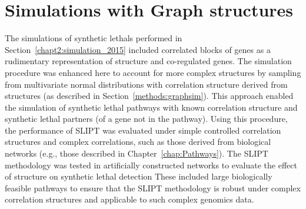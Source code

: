 

\iffalse
\section{Developing a linear model predictor of \glspl{synthetic lethal}}
\subsection{Linear models}
\subsection{Polynomial models}
\subsection{Conditioning}
\subsection{SLIPTv2}
\fi

\FloatBarrier

\section{Simulations with Graph structures}
\label{chapt5:graphsim}

The simulations of \glspl{synthetic lethal} performed in Section~\ref{chapt2:simulation_2015} included correlated blocks of genes as a rudimentary representation of  structure and co-regulated genes. The simulation procedure was enhanced here to account for more complex  structures by sampling from multivariate normal distributions with correlation structure derived from  structures (as described in Section~\ref{methods:graphsim}). This approach enabled the simulation of \gls{synthetic lethal} pathways with known correlation structure and synthetic lethal partners (of a gene not in the pathway).  Using this procedure, the performance of \gls{SLIPT} was evaluated under simple controlled correlation structures and complex correlations, such as those derived from biological networks (e.g., those described in Chapter~\ref{chap:Pathways}). The \gls{SLIPT} methodology was tested in artificially constructed networks to evaluate the effect of  structure on \gls{synthetic lethal} detection These included large biologically feasible pathways to ensure that the \gls{SLIPT} methodology is robust under complex correlation structures and applicable to such complex \glspl{genomic} data.

